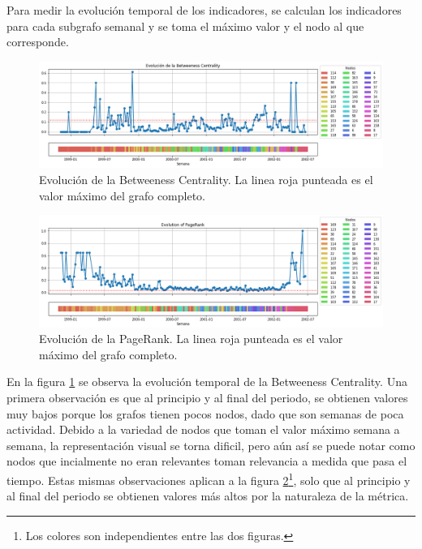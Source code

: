 \documentclass{article}
\begin{document}
Para medir la evolución temporal de los indicadores, se calculan los indicadores para cada subgrafo semanal y se toma el máximo valor y el nodo al que corresponde.

\begin{figure}[htb]
    \centering
    \includegraphics[width=\linewidth]{imagenes/ej1/betweeness.png}
    \caption{Evolución de la Betweeness Centrality. La linea roja punteada es el valor máximo del grafo completo.}
    \label{fig:betweeness_centrality}
\end{figure}

\begin{figure}[htb]
    \centering
    \includegraphics[width=\linewidth]{imagenes/ej1/pagerank.png}
    \caption{Evolución de la PageRank. La linea roja punteada es el valor máximo del grafo completo.}
    \label{fig:page_rank}
\end{figure}

En la figura \ref{fig:betweeness_centrality} se observa la evolución temporal de la Betweeness Centrality. Una primera observación es que al principio y al final del periodo, se obtienen valores muy bajos porque los grafos tienen pocos nodos, dado que son semanas de poca actividad.
Debido a la variedad de nodos que toman el valor máximo semana a semana, la representación visual se torna dificil, pero aún así se puede notar como nodos que incialmente no eran relevantes toman relevancia a medida que pasa el tiempo. Estas mismas observaciones aplican a la figura \ref{fig:page_rank}\footnote{Los colores son independientes entre las dos figuras.}, solo que al principio y al final del periodo se obtienen valores más altos por la naturaleza de la métrica.
\end{document}
